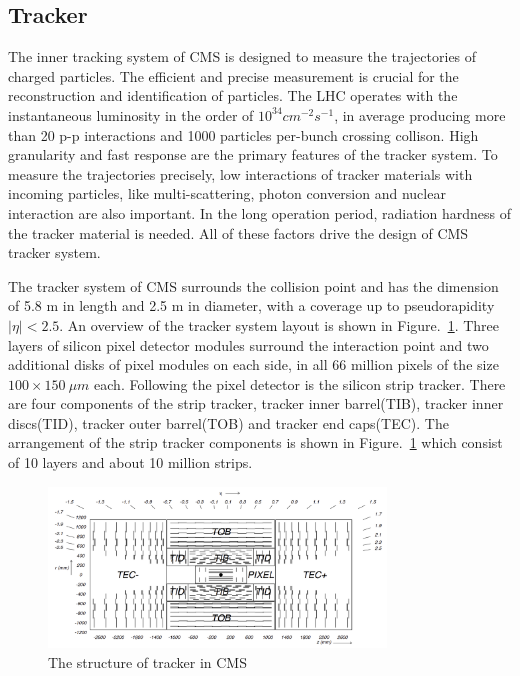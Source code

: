 \subsection{Tracker}
The inner tracking system of CMS is designed to measure the trajectories of charged particles. The efficient and precise measurement is crucial for the reconstruction and identification of particles. The LHC operates with the instantaneous luminosity in the order of $10^{34}cm^{-2}s^{-1}$, in average producing more than 20 p-p interactions and 1000 particles per-bunch crossing collison. High granularity and fast response are the primary features of the tracker system. To measure the trajectories precisely, low interactions of tracker materials with incoming particles, like multi-scattering, photon conversion and nuclear interaction are also important. In the long operation period, radiation hardness of the tracker material is needed. All of these factors drive the design of CMS tracker system.

The tracker system of CMS surrounds the collision point and has the dimension of 5.8 m in length and 2.5 m in diameter, with a coverage up to pseudorapidity $|\eta|<2.5$. An overview of the tracker system layout is shown in Figure.~\ref{fig:tracker_sketch}. Three layers of silicon pixel detector modules surround the interaction point and two additional disks of pixel modules on each side, in all 66 million pixels of the size $100\times150~ \mu m$ each. Following the pixel detector is the silicon strip tracker. There are four components of the strip tracker, tracker inner barrel(TIB), tracker inner discs(TID), tracker outer barrel(TOB) and tracker end caps(TEC). The arrangement of the strip tracker components is shown in Figure.~\ref{fig:tracker_sketch} which consist of 10 layers and about 10 million strips. 


\begin{figure}[htbp] 
\centering
\includegraphics[width=0.8\textwidth]{chapter3/Tracker_structure.png}
\caption[The structure of tracker in CMS]{The structure of tracker in CMS~\cite{CMS_experiment}}
\label{fig:tracker_sketch}
\end{figure}



